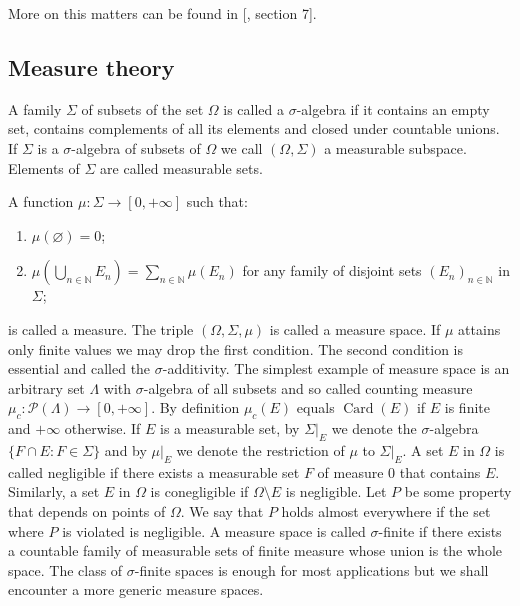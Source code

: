 More on this matters can be found in [\cite{BourbElemMathGenTopLivIII}, section
7].



\subsection{Measure theory}\label{SubSectionMeasureTheory}

A family $\Sigma$ of subsets of the set $\Omega$ is called a $\sigma$-algebra if
it contains an empty set, contains complements of all its elements and closed
under countable unions. If $\Sigma$ is a $\sigma$-algebra of subsets of $\Omega$
we call $(\Omega,\Sigma)$ a measurable subspace. Elements of $\Sigma$ are called
measurable sets. 

A function $\mu:\Sigma\to[0,+\infty]$ such that:  
\begin{enumerate}[label = (\roman*)]
  \item $\mu(\varnothing)=0$; 

  \item $\mu\left(\bigcup\limits_{n\in\mathbb{N}} E_n\right)
  =\sum\limits_{n\in\mathbb{N}}\mu(E_n)$ for any family of disjoint sets
  ${(E_n)}_{n\in\mathbb{N}}$ in $\Sigma$; 
\end{enumerate}

is called a measure. The triple $(\Omega,\Sigma,\mu)$ is called a measure space.
If $\mu$ attains only finite values we may drop the first condition. The second
condition is essential and called the $\sigma$-additivity. The simplest example
of measure space is an  arbitrary set $\Lambda$ with $\sigma$-algebra of all
subsets and so called counting measure
$\mu_c:\mathcal{P}(\Lambda)\to[0,+\infty]$. By definition $\mu_c(E)$ equals
$\operatorname{Card}(E)$ if $E$ is finite and $+\infty$ otherwise. If $E$ is a
measurable set, by $\Sigma|_E$ we denote the $\sigma$-algebra $ \{F\cap
E:F\in\Sigma \}$ and by $\mu|_E$ we denote the restriction of $\mu$ to
$\Sigma|_E$. A set $E$ in $\Omega$ is called negligible if there exists a
measurable set $F$ of measure $0$ that contains $E$. Similarly, a set $E$ in
$\Omega$ is conegligible if $\Omega\setminus E$ is negligible. Let $P$ be some
property that depends on points of $\Omega$. We say that $P$ holds almost
everywhere if the set where $P$ is violated is negligible. A measure space is
called $\sigma$-finite if there exists a countable family of measurable sets of
finite measure whose union is the whole space. The class of $\sigma$-finite
spaces is enough for most applications but we shall encounter a more generic
measure spaces.

